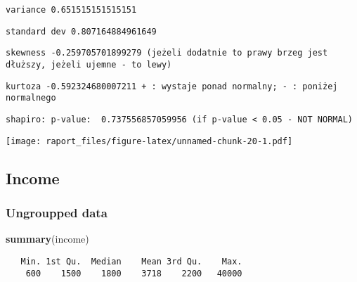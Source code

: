 \documentclass[]{article}
\newenvironment{Shaded}{\begin{snugshade}}{\end{snugshade}}
\newcommand{\KeywordTok}[1]{\textcolor[rgb]{0.13,0.29,0.53}{\textbf{{#1}}}}
\newcommand{\StringTok}[1]{\textcolor[rgb]{0.31,0.60,0.02}{{#1}}}
\newcommand{\CommentTok}[1]{\textcolor[rgb]{0.56,0.35,0.01}{\textit{{#1}}}}
\newcommand{\NormalTok}[1]{{#1}}
\begin{document}
\begin{verbatim}
variance 0.651515151515151
\end{verbatim}

\begin{verbatim}
standard dev 0.807164884961649
\end{verbatim}

\begin{verbatim}
skewness -0.259705701899279 (jeżeli dodatnie to prawy brzeg jest dłuższy, jeżeli ujemne - to lewy)
\end{verbatim}

\begin{verbatim}
kurtoza -0.592324680007211 + : wystaje ponad normalny; - : poniżej normalnego
\end{verbatim}

\begin{verbatim}
shapiro: p-value:  0.737556857059956 (if p-value < 0.05 - NOT NORMAL)
\end{verbatim}

\texttt{[image: raport\_files/figure-latex/unnamed-chunk-20-1.pdf]}

\subsection{Income}\label{income}

\begin{Shaded}
\end{Shaded}

\subsubsection{Ungroupped data}\label{ungroupped-data-1}

\begin{Shaded}
\begin{Highlighting}[]
\KeywordTok{summary}\NormalTok{(income)}
\end{Highlighting}
\end{Shaded}

\begin{verbatim}
   Min. 1st Qu.  Median    Mean 3rd Qu.    Max. 
    600    1500    1800    3718    2200   40000 
\end{verbatim}
\end{document}

